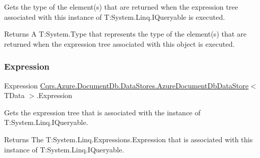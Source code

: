 Gets the type of the element(s) that are returned when the expression tree associated with this instance of T\+:\+System.\+Linq.\+I\+Queryable is executed. 

\begin{DoxyReturn}{Returns}
A T\+:\+System.\+Type that represents the type of the element(s) that are returned when the expression tree associated with this object is executed. 
\end{DoxyReturn}
\mbox{\label{classCqrs_1_1Azure_1_1DocumentDb_1_1DataStores_1_1AzureDocumentDbDataStore_a47d5ae1b47f4166210d1caab58467529_a47d5ae1b47f4166210d1caab58467529}} 
\subsubsection{\texorpdfstring{Expression}{Expression}}
{\footnotesize\ttfamily Expression \hyperlink{classCqrs_1_1Azure_1_1DocumentDb_1_1DataStores_1_1AzureDocumentDbDataStore}{Cqrs.\+Azure.\+Document\+Db.\+Data\+Stores.\+Azure\+Document\+Db\+Data\+Store}$<$ T\+Data $>$.Expression\hspace{0.3cm}{\ttfamily [get]}}



Gets the expression tree that is associated with the instance of T\+:\+System.\+Linq.\+I\+Queryable. 

\begin{DoxyReturn}{Returns}
The T\+:\+System.\+Linq.\+Expressions.\+Expression that is associated with this instance of T\+:\+System.\+Linq.\+I\+Queryable. 
\end{DoxyReturn}
\mbox{\label{classCqrs_1_1Azure_1_1DocumentDb_1_1DataStores_1_1AzureDocumentDbDataStore_af46a754a1576e4c2422b8a5d642abc5c_af46a754a1576e4c2422b8a5d642abc5c}} 
